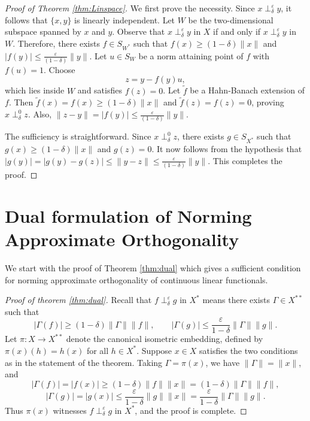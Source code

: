 \documentclass[11pt, reqno]{amsart}
\theoremstyle{definition}
\newcommand{\nperp}{\perp_{\delta}^\varepsilon}
\begin{document}
\begin{proof}[Proof of Theorem \ref{thm:Linspace}]
We first prove the necessity. Since $x\nperp y$, it follows that $\{x,y\}$ is linearly independent. Let $W$ be the two-dimensional subspace spanned by $x$ and $y$. Observe that $x\nperp y$ in $X$ if and only if $x\nperp y$ in $W$. Therefore, there exists $f\in S_{W^*}$ such that $f(x)\geq (1-\delta)\|x\|$ and $|f(y)|\leq \frac{\varepsilon}{(1-\delta)}\|y\|$. Let $u\in S_W$ be a norm attaining point of $f$ with $f(u)=1$. Choose
\[
z=y-f(y)u,
\]
which lies inside $W$ and satisfies $f(z)=0$. Let $\widetilde{f}$ be a Hahn-Banach extension of $f$. Then $\widetilde{f}(x)=f(x)\geq (1-\delta)\|x\|$ and $\widetilde{f}(z)=f(z)=0$, proving $x\perp_\delta^0 z$. Also, $\|z-y\|=|f(y)|\leq \frac{\varepsilon}{(1-\delta)}\|y\|$.

\medskip


\noindent The sufficiency is straightforward. Since $x\perp_\delta^0 z$, there exists $g\in S_{X^*}$ such that $g(x)\geq (1-\delta)\|x\|$ and $g(z)=0$. It now follows from the hypothesis that $|g(y)|=|g(y)-g(z)|\leq \|y-z\|\leq \frac{\varepsilon}{(1-\delta)}\|y\|.$ This completes the proof.
\end{proof}









\section{Dual formulation of Norming Approximate Orthogonality}\label{sec:dual}


\noindent We start with the proof of Theorem \ref{thm:dual} which gives a sufficient condition for norming approximate orthogonality of continuous linear functionals.

\begin{proof}[Proof of theorem \ref{thm:dual}]
Recall that $f \perp_\delta^\varepsilon g$ in $X^*$ means there exists $\Gamma \in X^{**}$ 
such that
\[
|\Gamma(f)| \geq (1-\delta)\|\Gamma\|\|f\|, \qquad |\Gamma(g)| \leq \frac{\varepsilon}{1-\delta}\|\Gamma\|\|g\|.
\]
Let $\pi: X \to X^{**}$ denote the canonical isometric embedding, defined by 
$\pi(x)(h) = h(x)$ for all $h \in X^*$. Suppose $x \in X$ satisfies the two 
conditions as in the statement of the theorem. Taking $\Gamma = \pi(x)$, we have $\|\Gamma\| = \|x\|$, and
\[
|\Gamma(f)| = |f(x)| \geq (1-\delta)\|f\|\|x\| = (1-\delta)\|\Gamma\|\|f\|,
\]
\[
|\Gamma(g)| = |g(x)| \leq \frac{\varepsilon}{1-\delta}\|g\|\|x\| = \frac{\varepsilon}{1-\delta}\|\Gamma\|\|g\|.
\]
Thus $\pi(x)$ witnesses $f \perp_\delta^\varepsilon g$ in $X^*$, and the proof is complete.
\end{proof}
\end{document}
